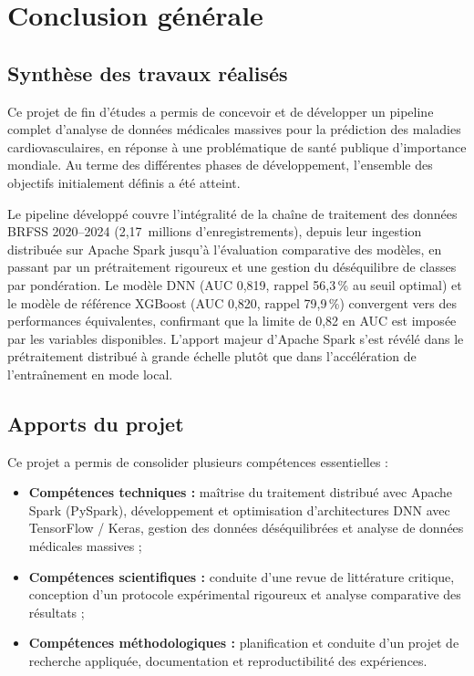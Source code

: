 \documentclass[12pt,a4paper]{report}
\begin{document}
\chapter*{Conclusion générale }

\section*{Synthèse des travaux réalisés}

Ce projet de fin d'études a permis de concevoir et de développer un pipeline
complet d'analyse de données médicales massives pour la prédiction des maladies
cardiovasculaires, en réponse à une problématique de santé publique d'importance
mondiale. Au terme des différentes phases de développement, l'ensemble des objectifs
initialement définis a été atteint.

Le pipeline développé couvre l'intégralité de la chaîne de traitement des données
\acs{BRFSS} 2020--2024 (2,17~millions d'enregistrements), depuis leur ingestion
distribuée sur Apache Spark jusqu'à l'évaluation comparative des modèles, en passant
par un prétraitement rigoureux et une gestion du déséquilibre de classes par
pondération. Le modèle \acs{DNN} (AUC 0,819, rappel 56,3\,\% au seuil optimal) et le
modèle de référence \acs{XGBoost} (AUC 0,820, rappel 79,9\,\%) convergent vers des
performances équivalentes, confirmant que la limite de 0,82 en AUC est imposée par
les variables disponibles. L'apport majeur d'Apache Spark s'est révélé dans le
prétraitement distribué à grande échelle plutôt que dans l'accélération de
l'entraînement en mode local.

\section*{Apports du projet}

Ce projet a permis de consolider plusieurs compétences essentielles :

\begin{itemize}
  \item \textbf{Compétences techniques :} maîtrise du traitement distribué avec
    Apache Spark (\acs{PySpark}), développement et optimisation d'architectures
    \acs{DNN} avec TensorFlow / Keras, gestion des données déséquilibrées et
    analyse de données médicales massives ;
  \item \textbf{Compétences scientifiques :} conduite d'une revue de littérature
    critique, conception d'un protocole expérimental rigoureux et analyse
    comparative des résultats ;
  \item \textbf{Compétences méthodologiques :} planification et conduite d'un
    projet de recherche appliquée, documentation et reproductibilité des expériences.
\end{itemize}
\end{document}
